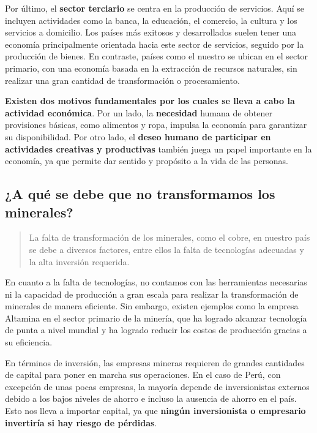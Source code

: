 \documentclass[
  jou,
  floatsintext,
  longtable,
  a4paper,
  nolmodern,
  notxfonts,
  notimes,
  12pt,
  colorlinks=true,linkcolor=blue,citecolor=blue,urlcolor=blue]{apa7}
\begin{document}
Por último, el \textbf{sector terciario} se centra en la producción de
servicios. Aquí se incluyen actividades como la banca, la educación, el
comercio, la cultura y los servicios a domicilio. Los países más
exitosos y desarrollados suelen tener una economía principalmente
orientada hacia este sector de servicios, seguido por la producción de
bienes. En contraste, países como el nuestro se ubican en el sector
primario, con una economía basada en la extracción de recursos
naturales, sin realizar una gran cantidad de transformación o
procesamiento.

\textbf{Existen dos motivos fundamentales por los cuales se lleva a cabo
la actividad económica}. Por un lado, la \textbf{necesidad} humana de
obtener provisiones básicas, como alimentos y ropa, impulsa la economía
para garantizar su disponibilidad. Por otro lado, el \textbf{deseo
humano de participar en actividades creativas y productivas} también
juega un papel importante en la economía, ya que permite dar sentido y
propósito a la vida de las personas.

\subsection{¿A qué se debe que no transformamos los
minerales?}\label{a-quuxe9-se-debe-que-no-transformamos-los-minerales}

\begin{quote}
La falta de transformación de los minerales, como el cobre, en nuestro
país se debe a diversos factores, entre ellos la falta de tecnologías
adecuadas y la alta inversión requerida.
\end{quote}

En cuanto a la falta de tecnologías, no contamos con las herramientas
necesarias ni la capacidad de producción a gran escala para realizar la
transformación de minerales de manera eficiente. Sin embargo, existen
ejemplos como la empresa Altamina en el sector primario de la minería,
que ha logrado alcanzar tecnología de punta a nivel mundial y ha logrado
reducir los costos de producción gracias a su eficiencia.

En términos de inversión, las empresas mineras requieren de grandes
cantidades de capital para poner en marcha sus operaciones. En el caso
de Perú, con excepción de unas pocas empresas, la mayoría depende de
inversionistas externos debido a los bajos niveles de ahorro e incluso
la ausencia de ahorro en el país. Esto nos lleva a importar capital, ya
que \textbf{ningún inversionista o empresario invertiría si hay riesgo
de pérdidas}.
\end{document}
